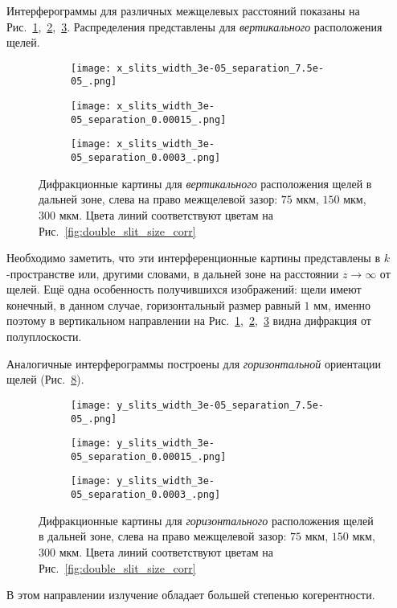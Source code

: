 Интерферограммы для различных межщелевых расстояний показаны на Рис.~\ref{fig:x_slits_75},~\ref{fig:x_slits_150},~\ref{fig:x_slits_300}. Распределения представлены для \textit{вертикального} расположения щелей.
\begin{figure}[H]
	\centering
	\begin{subfigure}{0.33\textwidth}
		\centering
		\texttt{[image: x\_slits\_width\_3e-05\_separation\_7.5e-05\_.png]}
		\caption{}
		\label{fig:x_slits_75}
	\end{subfigure}
	\begin{subfigure}{0.33\textwidth}
		\centering
		\texttt{[image: x\_slits\_width\_3e-05\_separation\_0.00015\_.png]}
		\caption{}
		\label{fig:x_slits_150}
	\end{subfigure}\hfill
	\begin{subfigure}{0.33\textwidth}
		\centering
		\texttt{[image: x\_slits\_width\_3e-05\_separation\_0.0003\_.png]}
		\caption{}
		\label{fig:x_slits_300}
	\end{subfigure}
	\caption{Дифракционные картины для \textit{вертикального} расположения щелей в дальней зоне, слева на право межщелевой зазор: $75$ мкм, $150$ мкм, $300$ мкм. Цвета линий соответствуют цветам на Рис.~\ref{fig:double_slit_size_corr}}
	\label{fig:x_slits}
\end{figure}
\noindent Необходимо заметить, что эти интерференционные картины представлены в $k$-пространстве или, другими словами, в дальней зоне на расстоянии $z \to \infty$ от щелей. Ещё одна особенность получившихся изображений: щели имеют конечный, в данном случае, горизонтальный размер равный $1$ мм, именно поэтому в вертикальном направлении на Рис.~\ref{fig:x_slits_75},~\ref{fig:x_slits_150},~\ref{fig:x_slits_300} видна дифракция от полуплоскости.

Аналогичные интерферограммы построены для \textit{горизонтальной} ориентации щелей (Рис.~\ref{fig:y_slits}).
\begin{figure}[H]
	\centering
	\begin{subfigure}{0.33\textwidth}
		\centering
		\texttt{[image: y\_slits\_width\_3e-05\_separation\_7.5e-05\_.png]}
		\caption{}
		\label{fig:y_slits_75}
	\end{subfigure}
	\begin{subfigure}{0.33\textwidth}
		\centering
		\texttt{[image: y\_slits\_width\_3e-05\_separation\_0.00015\_.png]}
		\caption{}
		\label{fig:y_slits_150}
	\end{subfigure}\hfill
	\begin{subfigure}{0.33\textwidth}
		\centering
		\texttt{[image: y\_slits\_width\_3e-05\_separation\_0.0003\_.png]}
		\caption{}
		\label{fig:y_slits_300}
	\end{subfigure}
	\caption{Дифракционные картины для \textit{горизонтального} расположения щелей в дальней зоне, слева на право межщелевой зазор: $75$ мкм, $150$ мкм, $300$ мкм. Цвета линий соответствуют цветам на Рис.~\ref{fig:double_slit_size_corr}}
	\label{fig:y_slits}
\end{figure}
\noindent В этом направлении излучение обладает большей степенью когерентности.

